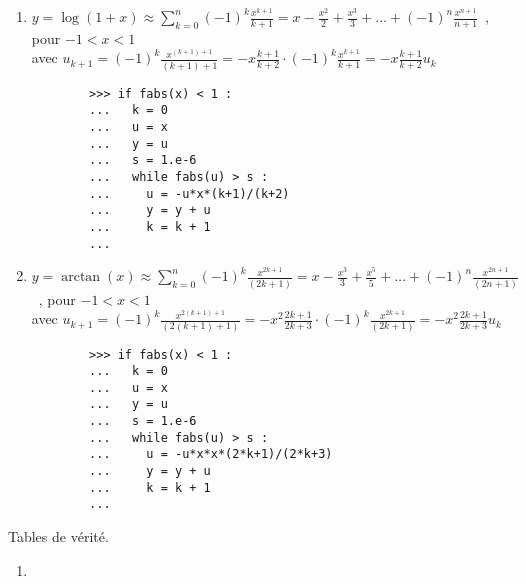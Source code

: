 \begin{description}
\begin{enumerate}
		\begin{py}{12cm}
		\begin{verbatim}
		>>> k = 0
		>>> u = 1.
		>>> y = u
		>>> s = 1.e-6
		>>> while fabs(u) > s :
		...   u = -u*x*x/((2*k+1)*(2*k+2))
		...   y = y + u
		...   k = k + 1
		... 
		\end{verbatim}
		\end{py}

	\item $\displaystyle y = \log(1+x) \approx \sum_{k=0}^{n} (-1)^k\frac{x^{k+1}}{k+1} = 
		x - \frac{x^2}{2} + \frac{x^3}{3} + \ldots + (-1)^n\frac{x^{n+1}}{n+1}$\ , 
		pour $-1 < x < 1$\\\mbox{}\hfill
		avec
		$\displaystyle u_{k+1} = (-1)^k\frac{x^{(k+1)+1}}{(k+1)+1} = -x\frac{k+1}{k+2}\cdot(-1)^k\frac{x^{k+1}}{k+1}
		= -x\frac{k+1}{k+2}u_k$

		\begin{py}{12cm}
		\begin{verbatim}
		>>> if fabs(x) < 1 :
		...   k = 0
		...   u = x
		...   y = u
		...   s = 1.e-6
		...   while fabs(u) > s :
		...     u = -u*x*(k+1)/(k+2)
		...     y = y + u
		...     k = k + 1
		... 
		\end{verbatim}
		\end{py}

	\item $\displaystyle y = \arctan(x) \approx \sum_{k=0}^{n} (-1)^k \frac{x^{2k+1}}{(2k+1)} = 
		x - \frac{x^3}{3} + \frac{x^5}{5} + \ldots + (-1)^n \frac{x^{2n+1}}{(2n+1)}$\ , 
		pour $-1 < x < 1$\\\mbox{}\hfill
		avec
		$\displaystyle u_{k+1} = (-1)^k \frac{x^{2(k+1)+1}}{(2(k+1)+1)} = -x^2\frac{2k+1}{2k+3}\cdot(-1)^k \frac{x^{2k+1}}{(2k+1)}
		= -x^2\frac{2k+1}{2k+3}u_k$

		\begin{py}{12cm}
		\begin{verbatim}
		>>> if fabs(x) < 1 :
		...   k = 0
		...   u = x
		...   y = u
		...   s = 1.e-6
		...   while fabs(u) > s :
		...     u = -u*x*x*(2*k+1)/(2*k+3)
		...     y = y + u
		...     k = k + 1
		... 
		\end{verbatim}
		\end{py}

	\end{enumerate}

\item[TD \ref{td:tablesVerite} :] Tables de vérité.

	\begin{minipage}[t]{7.5cm}
	\begin{enumerate}
	\item
	

\end{enumerate}
\end{minipage}
\end{description}
